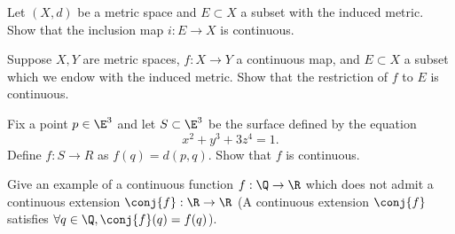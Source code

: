 \documentclass{assignment}
\begin{document}
\begin{question}[3]
  \begin{qparts}
    \item Let $(X,d)$ be a metric space and $E\subset X$ a subset with the induced metric. Show that the 
inclusion map $i: E \to X$ is continuous. 

    \item Suppose $X, Y$ are metric spaces, $f: X \to Y$ a continuous map, and $E\subset X$ a subset
which we endow with the induced metric. Show that the restriction of $f$ to $E$ is continuous.

    \item Fix a point $p\in\E^3$ and let $S\subset \E^3$ be the surface defined by the equation 
$$x^2 + y^3 + 3z^4 = 1.$$ Define $f:S \to R$ as $f(q) = d(p,q)$. Show that $f$ is continuous.
  \end{qparts}
\end{question}

\begin{question}[4]
  Give an example of a continuous function $f: \Q \to \R$ which does not admit a continuous extension
$\conj{f}: \R \to \R$ (A continuous extension $\conj{f}$ satisfies $\forall q\in\Q, \conj{f}(q) = f(q)$).
\end{question}
\end{document}
